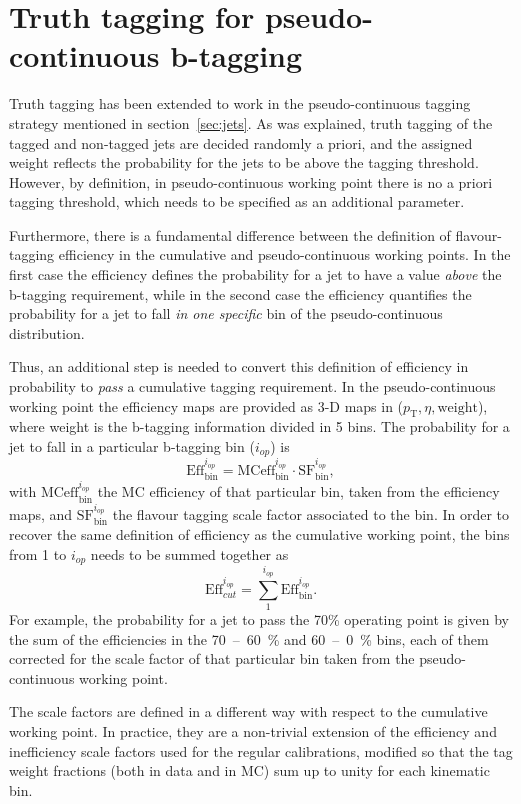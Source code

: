 \chapter{Truth tagging for pseudo-continuous b-tagging}
\label{app:truth-tag-pcbt}
Truth tagging has been extended to work in the pseudo-continuous tagging
strategy mentioned in section~\ref{sec:jets}. As was explained, truth tagging of
the tagged and non-tagged jets are decided randomly a priori, and the assigned
weight reflects the probability for the jets to be above the tagging threshold.
However, by definition, in pseudo-continuous working point there is no a priori
tagging threshold, which needs to be specified as an additional parameter.

Furthermore, there is a fundamental difference between the definition of
flavour-tagging efficiency in the cumulative and pseudo-continuous working
points. In the first case the efficiency defines the probability for a jet to
have a value \textit{above} the b-tagging requirement, while in the second case
the efficiency quantifies the probability for a jet to fall \textit{in one
  specific} bin of the pseudo-continuous distribution.

 Thus, an additional step is needed to convert this definition of efficiency in
 probability to \textit{pass} a cumulative tagging requirement.  In the
 pseudo-continuous working point the efficiency maps are provided as 3-D maps in
 ($p_{\mathrm{T}}, \eta, \text{weight}$), where weight is the b-tagging information divided
 in 5 bins. The probability for a jet to fall in a particular b-tagging
 bin ($i_{op}$) is
 \begin{equation}
   \text{Eff}_{\text{bin}}^{i_{op}} = \text{MCeff}_{\text{bin}}^{i_{op}} \cdot \text{SF}_{\text{bin}}^{i_{op}},
 \end{equation}
 with $\text{MCeff}_{\text{bin}}^{i_{op}}$ the MC efficiency of that particular
 bin, taken from the efficiency maps, and $\text{SF}_{\text{bin}}^{i_{op}}$ the
 flavour tagging scale factor associated to the bin. In order to recover the
 same definition of efficiency as the cumulative working point, the bins from 1
 to $i_{op}$ needs to be summed together as
 \begin{equation}
   \text{Eff}_{cut}^{i_{op}} = \sum_1^{i_{op}} \text{Eff}_{\text{bin}}^{i_{op}}.
 \end{equation}
 For example, the probability for a jet to pass the 70\% operating point is
 given by the sum of the efficiencies in the 70~--~60~\% and 60~--~0~\% bins,
 each of them corrected for the scale factor of that particular bin taken from
 the pseudo-continuous working point.
 
 The scale factors are defined in a different way with respect to the cumulative
 working point. In practice, they are a non-trivial extension of the efficiency
 and inefficiency scale factors used for the regular calibrations, modified so
 that the tag weight fractions (both in data and in MC) sum up to unity for each
 kinematic bin.